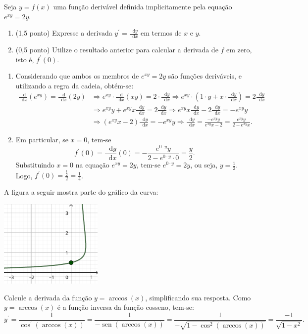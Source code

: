 \documentclass[12pt,a4paper]{article}
\newcommand*\diff{\mathop{}\!\mathrm{d}}
\newcommand*\sen{\operatorname{sen}}
\begin{document}
\begin{ExerciseList}
\Exercise[title={2,0}] Seja $y=f(x)$ uma função derivável definida implicitamente pela equação $e^{xy} = 2y$.
\begin{enumerate}
\item (1,5 ponto) Expresse a derivada $y^\prime = \frac{\diff{y}}{\diff{x}}$ em termos de $x$ e $y$.
\item (0,5 ponto) Utilize o resultado anterior para calcular a derivada de $f$ em zero, isto é, $f^\prime(0)$.
\end{enumerate}

\Answer
\begin{enumerate}
\item Considerando que ambos os membros de $e^{xy} = 2y$ são funções deriváveis, e utilizando a regra da cadeia, obtém-se:
\begin{align*}
  \frac{\diff}{\diff{x}} \left(e^{xy}\right) = \frac{\diff{}}{\diff{x}}(2y)
  & \Rightarrow
  e^{xy} \cdot \frac{\diff}{\diff{x}} \left(xy\right) = 2 \cdot \frac{\diff{y}}{\diff{x}}
  \Rightarrow
  e^{xy} \cdot \left(1 \cdot y + x \cdot \frac{\diff{y}}{\diff{x}} \right) = 2 \frac{\diff{y}}{\diff{x}} \\
  & \Rightarrow
  e^{xy} y + e^{xy}x \frac{\diff{y}}{\diff{x}} = 2 \frac{\diff{y}}{\diff{x}}
  \Rightarrow
  e^{xy}x \frac{\diff{y}}{\diff{x}} - 2 \frac{\diff{y}}{\diff{x}} = -e^{xy} y \\
  & \Rightarrow
  \left( e^{xy}x - 2 \right) \frac{\diff{y}}{\diff{x}} = -e^{xy} y
  \Rightarrow
  \frac{\diff{y}}{\diff{x}}
  = \frac{-e^{xy} y}{e^{xy}x - 2}
  = \frac{e^{xy} y}{2- e^{xy}x}.
\end{align*}
\item Em particular, se $x=0$, tem-se
\[
  f^\prime(0)
  = \frac{\diff{y}}{\diff{x}}(0)
  = - \frac{e^{0 \cdot y} y}{2 - e^{0 \cdot y} \cdot 0}
  = \frac{y}{2}.
\]
Substituindo $x=0$ na equação $e^{xy} = 2y$, tem-se $e^{0 \cdot y} = 2y$, ou seja, $y = \frac{1}{2}$. Logo, $f^\prime(0) = \frac{\frac{1}{2}}{2} = \frac{1}{4}$.
\end{enumerate}

A figura a seguir mostra parte do gráfico da curva:
\begin{center}
\includegraphics[width=5cm]{img/prova-2-nex-função-implícita.pdf}
\end{center}


\Exercise[title={2,0}] Calcule a derivada da função $y = \arccos(x)$, simplificando sua resposta.
\Answer Como $y = \arccos(x)$ é a função inversa da função cosseno, tem-se:
\[
  y^\prime
  = \frac{1}{\cos^\prime(\arccos(x))}
  = \frac{1}{-\sen(\arccos(x))}
  = \frac{1}{-\sqrt{1 - \cos^2(\arccos(x))}}
  = \frac{-1}{\sqrt{1 - x^2}}.
\]
\end{ExerciseList}
\end{document}
